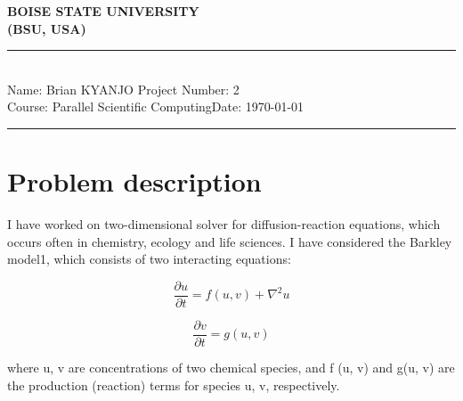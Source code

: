 \documentclass[12pt,a4paper]{article}
\newcommand{\student}{Brian KYANJO }
\newcommand{\course}{Parallel Scientific Computing}
\newcommand{\assignment}{2}
\begin{document}
	
	\thispagestyle{empty}
	\begin{center}
		\textbf{BOISE STATE UNIVERSITY \\[0.5cm]
			(BSU, USA)}
		\vspace{.2cm}
	\end{center}
	
	\noindent
	\rule{17cm}{0.2cm}\\[0.3cm]
	Name: \student \hfill Project Number: \assignment\\[0.1cm]
	Course: \course \hfill Date: \today\\
	\rule{17cm}{0.05cm}
	\vspace{.2cm}

\section*{Problem description}
I have worked on two-dimensional solver for diffusion-reaction equations, which occurs often in chemistry, ecology and life sciences. I have  considered the Barkley model1, which consists of two interacting equations:

\begin{equation}
	\frac{\partial  u}{\partial t} = f(u,v)  +  \nabla ^{2} u
\end{equation}

\begin{equation}
	\frac{\partial  v}{\partial t} = g(u,v)
\end{equation}

\noindent   where u, v are concentrations of two chemical species, and f (u, v) and g(u, v) are the production (reaction) terms for species u, v, respectively. 
\end{document}
